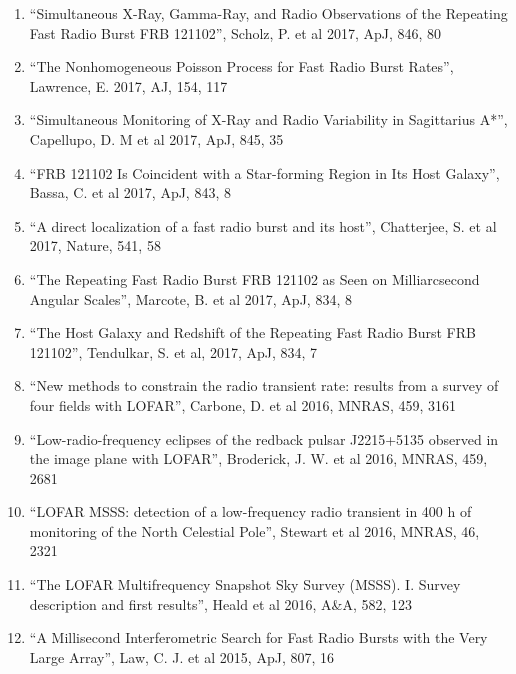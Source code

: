 \documentclass[11pt]{article}
\begin{document}
\begin{enumerate}
    \item ``Simultaneous X-Ray, Gamma-Ray, and Radio Observations of the Repeating Fast Radio Burst FRB 121102'', Scholz, P. et al 2017, ApJ, 846, 80

    \item ``The Nonhomogeneous Poisson Process for Fast Radio Burst Rates'', Lawrence, E. 2017, AJ, 154, 117
    
    \item ``Simultaneous Monitoring of X-Ray and Radio Variability in Sagittarius A*'', Capellupo, D. M et al 2017, ApJ, 845, 35
    
    \item ``FRB 121102 Is Coincident with a Star-forming Region in Its Host Galaxy'', Bassa, C. et al 2017, ApJ, 843, 8
    
    \item ``A direct localization of a fast radio burst and its host'', Chatterjee, S. et al 2017, Nature, 541, 58
    
    \item ``The Repeating Fast Radio Burst FRB 121102 as Seen on Milliarcsecond Angular Scales'', Marcote, B. et al 2017, ApJ, 834, 8

    \item ``The Host Galaxy and Redshift of the Repeating Fast Radio Burst FRB 121102'', Tendulkar, S. et al, 2017, ApJ, 834, 7

    \item ``New methods to constrain the radio transient rate: results from a survey of four fields with LOFAR'', Carbone, D. et al 2016, MNRAS, 459, 3161

    \item ``Low-radio-frequency eclipses of the redback pulsar J2215+5135 observed in the image plane with LOFAR'', Broderick, J. W. et al 2016, MNRAS, 459, 2681

    \item ``LOFAR MSSS: detection of a low-frequency radio transient in 400 h of monitoring of the North Celestial Pole'', Stewart et al 2016, MNRAS, 46, 2321

    \item ``The LOFAR Multifrequency Snapshot Sky Survey (MSSS). I. Survey description and first results'', Heald et al 2016, A\&A, 582, 123

    \item ``A Millisecond Interferometric Search for Fast Radio Bursts with the Very Large Array'', Law, C. J. et al 2015, ApJ, 807, 16


\end{enumerate}
\end{document}
